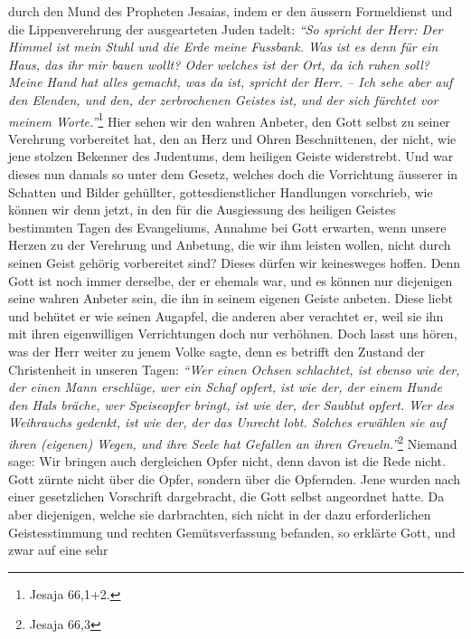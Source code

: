 durch den Mund des Propheten Jesaias, indem er den
äussern Formeldienst und
die Lippenverehrung der ausgearteten Juden tadelt:
\textit{"`So spricht der Herr: Der
Himmel ist mein Stuhl und die Erde meine Fussbank. Was ist es denn für ein
Haus, das ihr mir bauen wollt? Oder welches ist der Ort, da ich ruhen soll?
Meine Hand hat alles gemacht, was da ist, spricht der Herr. -- Ich sehe aber auf
den Elenden, und den, der zerbrochenen Geistes ist, und der sich fürchtet vor
meinem Worte."'}\footnote{Jesaja 66,1+2.}
Hier sehen wir den wahren Anbeter, den
Gott selbst zu seiner Verehrung vorbereitet hat, den an Herz und Ohren
Beschnittenen, der nicht, wie jene stolzen Bekenner des
Judentums, dem
heiligen Geiste widerstrebt. Und war dieses nun damals
so unter dem Gesetz, welches doch die Vorrichtung
äusserer
in Schatten und
Bilder gehüllter, gottesdienstlicher Handlungen vorschrieb, wie können wir denn
jetzt, in den für die Ausgiessung des heiligen Geistes bestimmten Tagen des
Evangeliums, Annahme bei Gott erwarten, wenn unsere Herzen
zu der Verehrung und
Anbetung, die wir ihm leisten wollen, nicht durch seinen Geist gehörig
vorbereitet sind? Dieses dürfen wir keinesweges hoffen. Denn Gott ist noch immer
derselbe, der er ehemals war, und es können nur
diejenigen seine wahren Anbeter sein, die ihn in seinem
eigenen Geiste anbeten.
Diese liebt und behütet er wie seinen Augapfel, die anderen aber verachtet er,
weil sie ihn mit ihren eigenwilligen Verrichtungen doch nur verhöhnen. Doch
lasst uns hören, was der Herr weiter zu jenem Volke sagte, denn es betrifft den
Zustand der Christenheit in unseren Tagen:
\textit{"`Wer einen Ochsen schlachtet, ist
ebenso wie der, der einen Mann erschlüge, wer ein Schaf opfert, ist wie der, der
einem
Hunde den Hals bräche, wer Speiseopfer bringt, ist wie der, der Saublut
opfert. Wer des Weihrauchs gedenkt, ist wie der, der
das Unrecht lobt. Solches erwählen sie auf ihren (eigenen) Wegen, und ihre Seele
hat Gefallen an ihren Greueln."'}\footnote{Jesaja 66,3}
Niemand sage: Wir bringen
auch dergleichen Opfer nicht, denn davon ist die Rede nicht. Gott zürnte nicht
über die Opfer, sondern über die Opfernden. Jene wurden nach einer gesetzlichen
Vorschrift dargebracht, die Gott selbst angeordnet hatte. Da aber diejenigen,
welche sie darbrachten, sich nicht in der dazu erforderlichen Geistesstimmung
und rechten Gemütsverfassung befanden, so erklärte Gott, und zwar auf eine sehr
